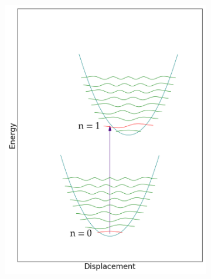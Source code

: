 \documentclass[12pt, fleqn]{beamer}
\begin{document}
\begin{frame}
\begin{overlayarea}{\textwidth}{14cm}
{\begin{figure}[h!]
\begin{subfigure}[b]{0.45\linewidth}
                    \includegraphics[width=\linewidth]{fc/tr_1.png}
                \end{subfigure}
                \begin{subfigure}[b]{0.45\linewidth}

\end{subfigure}
\end{figure}}
\end{overlayarea}
\end{frame}
\end{document}
